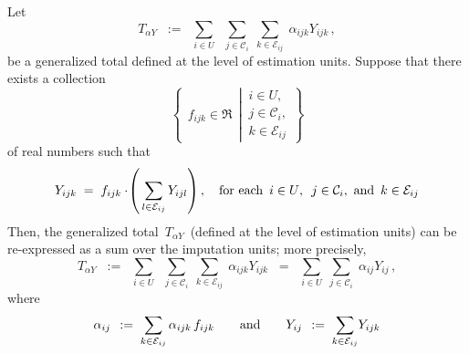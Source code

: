 \vskip 0.2cm
\begin{lemma}
\label{GeneralizedTotalsAsSumsOverImputationUnits}
\mbox{}
\vskip 0.1cm
\noindent
Let
\begin{equation*}
T_{\alpha Y}
\;\; := \;\;
    \underset{i \in U}{\sum}\;\;
    \underset{j \in \mathcal{C}_{i}}{\sum}\;
    \underset{k \in \mathcal{E}_{ij}}{\sum}\;
    \alpha_{ijk}Y_{ijk}\,,
\end{equation*}
be a generalized total defined at the level of estimation units.
\vskip 0.1cm
\noindent
Suppose that there exists a collection
\begin{equation*}
\left\{\;\,
    f_{ijk} \in \Re
    \;\,\left\vert\,
    \begin{array}{c} i \in U, \\ j \in \mathcal{C}_{i}, \\ k \in \mathcal{E}_{ij} \end{array}
    \right.
    \!\!\right\}
\end{equation*}
of real numbers such that
\begin{equation*}
Y_{ijk}
\; = \;
    f_{ijk}\cdot\!\left(\,
        \underset{l\in\mathcal{E}_{ij}}{\sum}\,Y_{ijl}
        \right),
\quad
\textnormal{for each \,$i \in U$,\, \,$j \in \mathcal{C}_{i}$,\, and \,$k \in \mathcal{E}_{ij}$}
\end{equation*}
Then, the generalized total \,$T_{\alpha Y}$\, (defined at the level of estimation units)
can be re-expressed as a sum over the imputation units; more precisely,
\begin{equation*}
T_{\alpha Y}
\;\; := \;\;
    \underset{i \in U}{\sum}\;\;
    \underset{j \in \mathcal{C}_{i}}{\sum}\;
    \underset{k \in \mathcal{E}_{ij}}{\sum}\;
    \alpha_{ijk}Y_{ijk}
\;\; = \;\;
    \underset{i \in U}{\sum}\;
    \underset{j \in \mathcal{C}_{i}}{\sum}\;
    \alpha_{ij}Y_{ij}\,,
\end{equation*}
where
\begin{equation*}
\alpha_{ij}
\;\, := \;
    \underset{k \in \mathcal{E}_{ij}}{\sum}\,\alpha_{ijk}\,f_{ijk}
\quad\quad
\textnormal{and}
\quad\quad
Y_{ij}
\;\, := \;
    \underset{k \in \mathcal{E}_{ij}}{\sum}Y_{ijk}
\end{equation*}
\end{lemma}
\proof
